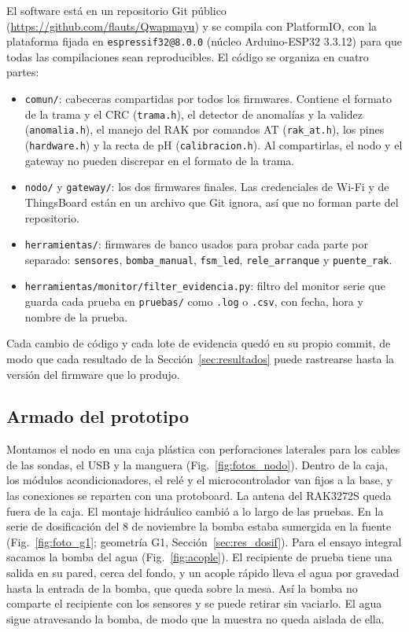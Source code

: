 El software está en un repositorio Git público (\url{https://github.com/flauts/Qwapmayu}) y se compila con PlatformIO, con la plataforma fijada en \texttt{espressif32@8.0.0} (núcleo Arduino-ESP32 3.3.12) para que todas las compilaciones sean reproducibles. El código se organiza en cuatro partes:
\begin{itemize}
    \item \texttt{comun/}: cabeceras compartidas por todos los firmwares. Contiene el formato de la trama y el CRC (\texttt{trama.h}), el detector de anomalías y la validez (\texttt{anomalia.h}), el manejo del RAK por comandos AT (\texttt{rak\_at.h}), los pines (\texttt{hardware.h}) y la recta de pH (\texttt{calibracion.h}). Al compartirlas, el nodo y el gateway no pueden discrepar en el formato de la trama.
    \item \texttt{nodo/} y \texttt{gateway/}: los dos firmwares finales. Las credenciales de Wi-Fi y de ThingsBoard están en un archivo que Git ignora, así que no forman parte del repositorio.
    \item \texttt{herramientas/}: firmwares de banco usados para probar cada parte por separado: \texttt{sensores}, \texttt{bomba\_manual}, \texttt{fsm\_led}, \texttt{rele\_arranque} y \texttt{puente\_rak}.
    \item \texttt{herramientas/monitor/filter\_evidencia.py}: filtro del monitor serie que guarda cada prueba en \texttt{pruebas/} como \texttt{.log} o \texttt{.csv}, con fecha, hora y nombre de la prueba.
\end{itemize}
Cada cambio de código y cada lote de evidencia quedó en su propio commit, de modo que cada resultado de la Sección~\ref{sec:resultados} puede rastrearse hasta la versión del firmware que lo produjo.

\subsection{Armado del prototipo}
\label{sec:armado}

Montamos el nodo en una caja plástica con perforaciones laterales para los cables de las sondas, el USB y la manguera (Fig.~\ref{fig:fotos_nodo}). Dentro de la caja, los módulos acondicionadores, el relé y el microcontrolador van fijos a la base, y las conexiones se reparten con una protoboard. La antena del RAK3272S queda fuera de la caja. El montaje hidráulico cambió a lo largo de las pruebas. En la serie de dosificación del 8 de noviembre la bomba estaba sumergida en la fuente (Fig.~\ref{fig:foto_g1}; geometría G1, Sección~\ref{sec:res_dosif}). Para el ensayo integral sacamos la bomba del agua (Fig.~\ref{fig:acople}). El recipiente de prueba tiene una salida en su pared, cerca del fondo, y un acople rápido lleva el agua por gravedad hasta la entrada de la bomba, que queda sobre la mesa. Así la bomba no comparte el recipiente con los sensores y se puede retirar sin vaciarlo. El agua sigue atravesando la bomba, de modo que la muestra no queda aislada de ella.

